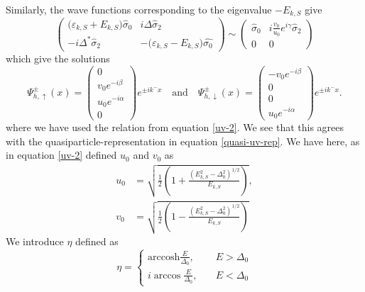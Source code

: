 Similarly, the wave functions corresponding to the eigenvalue $-E_{k,S}$ give
\begin{equation}
\begin{pmatrix}
\big(\varepsilon_{k,S} + E_{k,S}\big) \hat{\sigma}_0 & i\Delta\hat{\sigma}_2 \\
-i\Delta^*\hat{\sigma}_2 & -\big(\varepsilon_{k,S} - E_{k,S}\big)\hat{\sigma_0}  
\end{pmatrix}
\sim
\begin{pmatrix}
\hat{\sigma}_0 & i\frac{v_0}{u_0}e^{i\gamma}\hat{\sigma}_2 \\
0 & 0
\end{pmatrix}
\end{equation}
which give the solutions
\begin{equation}
    \Psi^{\pm}_{h,\uparrow}(x) = 
    \begin{pmatrix}
        0 \\ v_0e^{-i\beta} \\ u_0e^{-i\alpha}\\0
    \end{pmatrix}e^{\pm ik^-x}
    \quad \mathrm{and} \quad 
    \Psi^{\pm}_{h,\downarrow}(x) = 
    \begin{pmatrix}
        -v_0e^{-i\beta} \\ 0 \\ 0 \\ u_0e^{-i\alpha}
    \end{pmatrix}e^{\pm ik^-x}.
\end{equation}
where we have used the relation from equation \eqref{uv-2}. We see that this agrees with the quasiparticle-representation in equation \eqref{quasi-uv-rep}. We have here, as in equation \eqref{uv-2} defined $u_0$ and $v_0$ as 
\begin{equation}
\begin{split}
    u_0 &= \sqrt{\frac{1}{2}\left(1+\frac{\left(E_{k,S}^2 - \Delta_0^2\right)^{1/2}}{E_{k,S}}\right)},\\
    v_0 &= \sqrt{\frac{1}{2}\left(1-\frac{\left(E_{k,S}^2 - \Delta_0^2\right)^{1/2}}{E_{k,S}}\right)}
\end{split}
\end{equation}
We introduce $\eta$ defined as 
\begin{equation}
    \eta = 
    \begin{cases}
        \mathrm{arccosh}\frac{E}{\Delta_0}, & \quad E>\Delta_0 \\
        i\arccos\frac{E}{\Delta_0}, & \quad E<\Delta_0
    \end{cases}
\end{equation}
